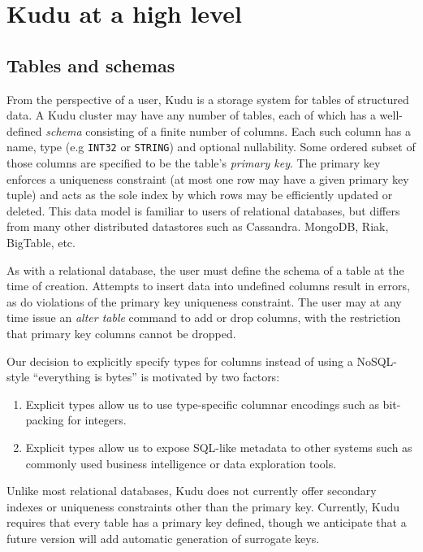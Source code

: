 \documentclass[twocolumn,9pt]{article}
\begin{document}
\section{Kudu at a high level}
\label{sec:high-level}

\subsection{Tables and schemas}
From the perspective of a user, Kudu is a storage system for tables of structured data.
A Kudu cluster may have any number of tables, each of which has a well-defined {\em schema}
consisting of a finite number of columns. Each such column has a name, type (e.g {\tt INT32}
or {\tt STRING}) and optional nullability. Some ordered subset of those columns
are specified to be the table's {\em primary key}. The primary key enforces a uniqueness constraint
(at most one row may have a given primary key tuple) and acts as the sole index by which
rows may be efficiently updated or deleted. This data model is familiar to users of relational
databases, but differs from many other distributed datastores such as Cassandra.
MongoDB\cite{mongodb}, Riak\cite{riak}, BigTable\cite{bigtable}, etc.

As with a relational database, the user must define the schema of a table at the time of creation.
Attempts to insert data into undefined columns result in errors, as do violations of the primary
key uniqueness constraint. The user may at any time issue an {\em alter table} command to add
or drop columns, with the restriction that primary key columns cannot be dropped.

Our decision to explicitly specify types for columns instead of using a NoSQL-style ``everything
is bytes'' is motivated by two factors:
\begin{enumerate}
\item Explicit types allow us to use type-specific columnar encodings such as bit-packing for
  integers.
\item Explicit types allow us to expose SQL-like metadata to other systems such as commonly used
  business intelligence or data exploration tools.
\end{enumerate}

Unlike most relational databases, Kudu does not currently offer secondary indexes or uniqueness constraints
other than the primary key. Currently, Kudu requires that every table has a primary key defined,
though we anticipate that a future version will add automatic generation of surrogate keys.
\end{document}
